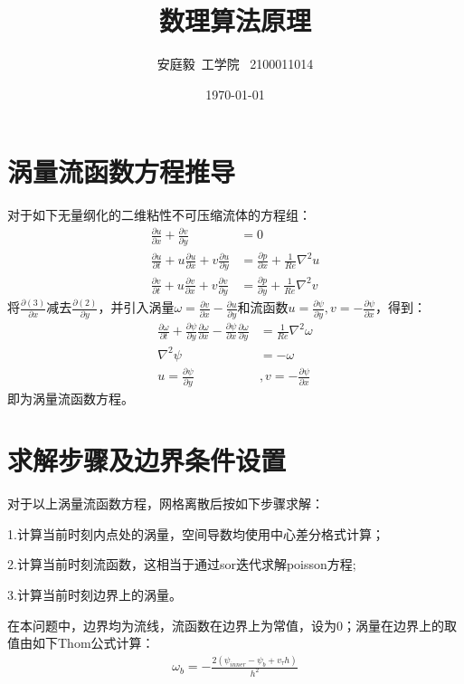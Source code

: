 \documentclass[12pt, a4paper]{article}
\title{数理算法原理}
\author{安庭毅\ 工学院 \ 2100011014}
\date{\today} %
\begin{document}
\maketitle %
\section{涡量流函数方程推导}
对于如下无量纲化的二维粘性不可压缩流体的方程组：
\begin{align}
    \frac{\partial u}{\partial x} + \frac{\partial v}{\partial y} &= 0 \\
    \frac{\partial u}{\partial t} + u \frac{\partial u}{\partial x} + v \frac{\partial u}{\partial y} &=
    \frac{\partial p}{\partial x} + \frac{1}{Re}\nabla^2u \\
    \frac{\partial v}{\partial t} + u \frac{\partial v}{\partial x} + v \frac{\partial v}{\partial y} &=
    \frac{\partial p}{\partial y} + \frac{1}{Re}\nabla^2v
\end{align}
将$\frac{\partial (3)}{\partial x}$减去$\frac{\partial (2)}{\partial y}$，并引入涡量$\omega=\frac{\partial v}{\partial x}-\frac{\partial u}{\partial y}$和流函数$u=\frac{\partial \psi}{\partial y}, v = -\frac{\partial \psi}{\partial x}$，得到：
\begin{align}
    \frac{\partial \omega}{\partial t} + \frac{\partial \psi}{\partial y}\frac{\partial \omega}{\partial x} - \frac{\partial \psi}{\partial x}\frac{\partial \omega}{\partial y} &= \frac{1}{Re}\nabla^2{\omega} \\
    \nabla^2 \psi &= -\omega \\
    u=\frac{\partial \psi}{\partial y}&, v = -\frac{\partial \psi}{\partial x}
\end{align}
即为涡量流函数方程。

\section{求解步骤及边界条件设置}
对于以上涡量流函数方程，网格离散后按如下步骤求解：

1.计算当前时刻内点处的涡量，空间导数均使用中心差分格式计算；

2.计算当前时刻流函数，这相当于通过sor迭代求解poisson方程;

3.计算当前时刻边界上的涡量。

在本问题中，边界均为流线，流函数在边界上为常值，设为0；涡量在边界上的取值由如下Thom公式计算：
\begin{align}
    \omega_b = -\frac{2(\psi_{inner} - \psi_b + v_\tau h)}{h^2}
\end{align}
\end{document}
